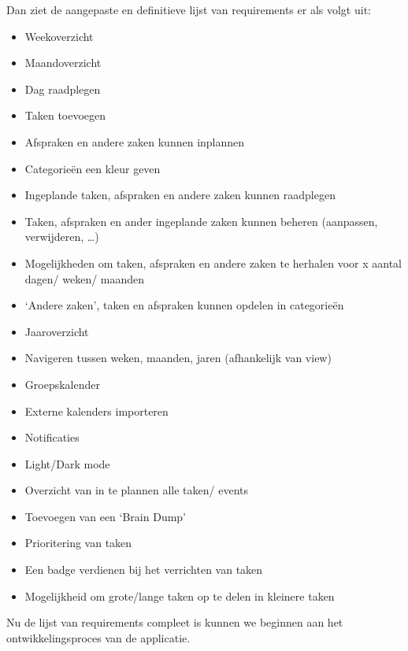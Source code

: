 Dan ziet de aangepaste en definitieve lijst van requirements er als volgt uit:
\begin{itemize}
   \item	Weekoverzicht
   \item	Maandoverzicht
   \item	Dag raadplegen
   \item	Taken toevoegen
   \item	Afspraken en andere zaken kunnen inplannen
   \item	Categorieën een kleur geven
   \item	Ingeplande taken, afspraken en andere zaken kunnen raadplegen
   \item	Taken, afspraken en ander ingeplande zaken kunnen beheren (aanpassen, verwijderen, …)
   \item	Mogelijkheden om taken, afspraken en andere zaken te herhalen voor x aantal dagen/ weken/ maanden
   \item	‘Andere zaken’, taken en afspraken kunnen opdelen in categorieën
   \item	Jaaroverzicht
   \item	Navigeren tussen weken, maanden, jaren (afhankelijk van view)
   \item	Groepskalender
   \item	Externe kalenders importeren
   \item	Notificaties
   \item	Light/Dark mode
   \item	Overzicht van in te plannen alle taken/ events
   \item	Toevoegen van een ‘Brain Dump’ 
   \item	Prioritering van taken
   \item	Een badge verdienen bij het verrichten van taken
   \item	Mogelijkheid om grote/lange taken op te delen in kleinere taken
\end{itemize}

Nu de lijst van requirements compleet is kunnen we beginnen aan het ontwikkelingsproces van de applicatie.
